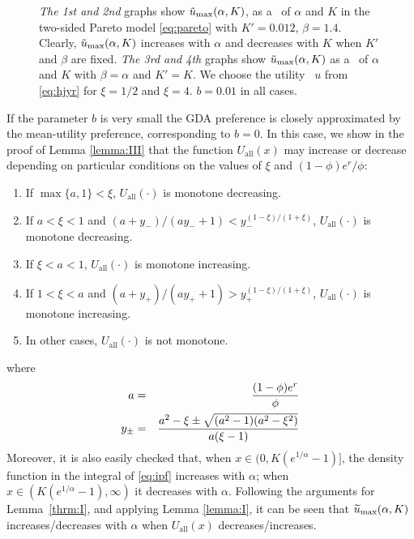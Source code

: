 \begin{figure}[htb!]
\begin{minipage}{0.25\linewidth}
  \end{minipage}
  \caption{
   {\em The 1st and 2nd} graphs show
   $\tilde u_{\rm max}(\alpha, K)$, as a \fct\ of $\alpha$ and $K$
   in the two-sided Pareto model \eqref{eq:pareto} with $K'=0.012$,
   $\beta = 1.4$.
   Clearly, $\tilde u_{\rm max}(\alpha, K)$ increases with $\alpha$
   and decreases with $K$ when $K'$ and $\beta$ are fixed.
   {\em The 3rd and 4th} graphs show
   $\tilde u_{\rm max}(\alpha, K)$ as a \fct\ of $\alpha$
   and $K$ with $\beta = \alpha$ and $K' = K$.
   We choose the utility \fct\ $u$ from \eqref{eq:hjyr} for $\xi = 1/2$
   and $\xi = 4$. $b = 0.01$ in all cases.
  }
  \label{fig:preference_pareto}
\end{figure}

If the parameter $b$ is very small the GDA preference is closely
approximated by the mean-utility preference, corresponding to $b = 0$. 
In this case, we show in the proof of Lemma \ref{lemma:III} that the function
$U_{\text{all}}(x)$ may increase or decrease depending on particular conditions
on the values of $\xi$ and $(1 - \phi) e^r / \phi$:
\begin{enumerate}
\item If $\max\{a, 1\} < \xi$, $U_{\text{all}}(\cdot)$ is
  monotone decreasing.
\item If $a < \xi < 1$ and $(a + y_-)/(a y_- + 1) <
  y_-^{(1-\xi)/(1+\xi)}$, $U_{\text{all}}(\cdot)$ is monotone
  decreasing.
\item If $\xi < a < 1$, $U_{\text{all}}(\cdot)$ is monotone
  increasing.
\item If $1 < \xi < a$ and $(a + y_+)/(a y_+ + 1) >
  y_+^{(1-\xi)/(1+\xi)}$, $U_{\text{all}}(\cdot)$ is monotone
  increasing.
\item In other cases, $U_{\text{all}}(\cdot)$ is not monotone.
\end{enumerate}
where
\begin{eqnarray*}
a &=& {
  (1 - \phi) e^r
  \over
  \phi
} \\
y_\pm &=& {
  a^2 - \xi \pm \sqrt{(a^2 - 1) (a^2 - \xi^2)}
  \over
  a (\xi - 1)
}
\end{eqnarray*}
Moreover, it is also easily checked that, when
$x \in (0, K(e^{1/\alpha} - 1)]$,
the density function in the integral of \eqref{eq:ipf} increases
with $\alpha$; when $x \in (K(e^{1/\alpha} - 1), \infty)$ it 
decreases with $\alpha$. Following the arguments for Lemma~\ref{thrm:I},
and applying Lemma \ref{lemma:I}, it can be seen that
$\widetilde u_{\rm max}(\alpha, K)$ increases/decreases with $\alpha$ when
$U_{\text{all}}(x)$  decreases/increases.

